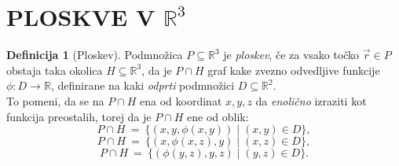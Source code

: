 \documentclass[11pt]{article}
\theoremstyle{definition}
\newtheorem{definicija}{Definicija}[section]
\theoremstyle{definition}
\theoremstyle{definition}
\begin{document}

\pagebreak


\section{PLOSKVE V $\mathbb{R}^3$}
\vspace{0.5cm}


\begin{definicija}[Ploskev]

Podmnožica $P \subseteq \mathbb{R}^3$ je \textit{ploskev}, če za vsako točko $\vec{r} \in P$ obstaja taka okolica $H \subseteq \mathbb{R}^3$, da je $P \cap H$ graf kake zvezno odvedljive funkcije $\phi: D \rightarrow \mathbb{R}$, definirane na kaki \textit{odprti} podmnožici $D \subseteq \mathbb{R}^2$. \\
To pomeni, da se na $P \cap H$ ena od koordinat $x, y, z$ da \textit{enolično} izraziti kot funkcija preostalih, torej da je $P \cap H$ ene od oblik:
$$P \cap H ~=~ \{(x, y, \phi(x, y)) \mid (x, y) \in D\},$$
$$P \cap H ~=~ \{(x, \phi(x, z), y) \mid (x, z) \in D\},$$
$$P \cap H ~=~ \{(\phi(y, z), y, z) \mid (y, z) \in D\}.$$

\end{definicija}
\vspace{0.5cm}
\end{document}
